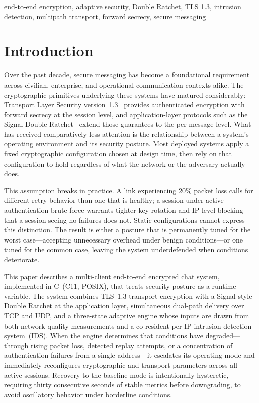 \documentclass[conference]{IEEEtran}
\begin{document}
\begin{IEEEkeywords}
end-to-end encryption, adaptive security, Double Ratchet, TLS 1.3, intrusion detection,
multipath transport, forward secrecy, secure messaging
\end{IEEEkeywords}

\section{Introduction}

Over the past decade, secure messaging has become a foundational requirement across
civilian, enterprise, and operational communication contexts alike. The cryptographic
primitives underlying these systems have matured considerably: Transport Layer Security
version~1.3~\cite{b3} provides authenticated encryption with forward secrecy at the
session level, and application-layer protocols such as the Signal Double
Ratchet~\cite{b1} extend those guarantees to the per-message level. What has received
comparatively less attention is the relationship between a system's operating environment
and its security posture. Most deployed systems apply a fixed cryptographic configuration
chosen at design time, then rely on that configuration to hold regardless of what the
network or the adversary actually does.

This assumption breaks in practice. A link experiencing 20\% packet loss calls for
different retry behavior than one that is healthy; a session under active authentication
brute-force warrants tighter key rotation and IP-level blocking that a session seeing
no failures does not. Static configurations cannot express this distinction. The result
is either a posture that is permanently tuned for the worst case—accepting unnecessary
overhead under benign conditions—or one tuned for the common case, leaving the system
underdefended when conditions deteriorate.

This paper describes a multi-client end-to-end encrypted chat system, implemented in
C~(C11, POSIX), that treats security posture as a runtime variable. The system combines
TLS~1.3 transport encryption with a Signal-style Double Ratchet at the application
layer, simultaneous dual-path delivery over TCP and UDP, and a three-state adaptive
engine whose inputs are drawn from both network quality measurements and a co-resident
per-IP intrusion detection system~(IDS). When the engine determines that conditions have
degraded—through rising packet loss, detected replay attempts, or a concentration of
authentication failures from a single address—it escalates its operating mode and
immediately reconfigures cryptographic and transport parameters across all active
sessions. Recovery to the baseline mode is intentionally hysteretic, requiring thirty
consecutive seconds of stable metrics before downgrading, to avoid oscillatory behavior
under borderline conditions.
\end{document}
